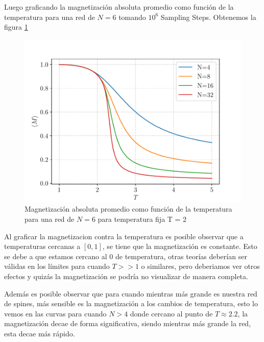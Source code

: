 \documentclass[11pt,a4paper]{article}
\begin{document}
Luego graficando la magnetización absoluta promedio como función de la temperatura para una red de $N = 6$ tomando $10^6$ Sampling Steps. Obtenemos la figura \ref{fig:p3_3}
\begin{figure}[H]
    \centering
    \includegraphics[scale=0.65]{p3/T_vs_M.pdf}
    \caption{Magnetización absoluta promedio como función de la temperatura para una red de $N = 6$ para temperatura fija T = 2}
    \label{fig:p3_3}
\end{figure}
Al graficar la magnetizacion contra la temperatura es posible observar que a temperaturas cercanas a $[0,1] $, se tiene que la magnetización es constante. Esto se debe a que estamos cercano al 0 de temperatura,
otras teorías deberían ser válidas en los límites para cuando $T>> 1$ o similares, pero deberiamos ver otros efectos y quizás la magnetización se podría no visualizar de manera completa. 
\par
Además es posible observar que para cuando mientras más grande es nuestra red de spines, más sensible es la magnetización a los cambios de temperatura, esto lo vemos en las curvas para cuando $N > 4$ donde cercano al punto de $T \approx 2.2$, la 
magnetización decae de forma significativa, siendo mientras más grande la red, esta decae más rápido.

\newpage
\end{document}

